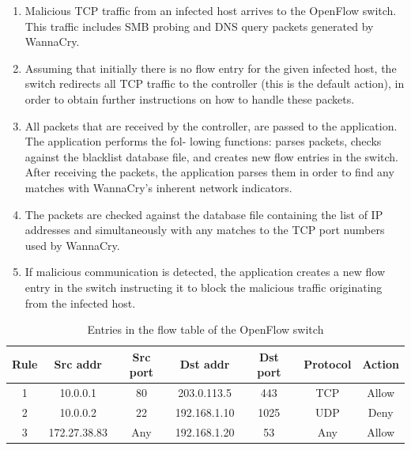 \documentclass[12pt,letterpaper]{article}
\begin{document}
            \begin{enumerate}
                \item Malicious \ac{TCP} traffic from an infected host arrives to the OpenFlow switch. This traffic includes \ac{SMB} probing and DNS query packets generated by WannaCry.

                \item Assuming that initially there is no flow entry for the given infected host, the switch redirects all TCP traffic to the controller (this is the default action), in order to obtain further instructions on how to handle these packets.

                \item All packets that are received by the controller, are passed to the application. The application performs the fol- lowing functions: parses packets, checks against the blacklist database file, and creates new flow entries in the switch. After receiving the packets, the application parses them in order to find any matches with WannaCry’s inherent network indicators.

                \item The packets are checked against the database file containing the list of IP addresses and simultaneously with any matches to the TCP port numbers used by WannaCry.

                \item If malicious communication is detected, the application creates a new flow entry in the switch instructing it to block the malicious traffic originating from the infected host.
               
            \end{enumerate}


            \begin{table}[h]
                \centering
                \caption{Entries in the flow table of the OpenFlow switch}
                \label{tab:firewall-rules}
                    \begin{tabular}{ccccccc}
                        \toprule
                \textbf{Rule} & \textbf{Src addr} & \textbf{Src port} & \textbf{Dst addr} & \textbf{Dst port} & \textbf{Protocol} & \textbf{Action} \\
                \midrule
        1 & 10.0.0.1 & 80 & 203.0.113.5 & 443 & TCP & Allow \\
        2 & 10.0.0.2 & 22 & 192.168.1.10 & 1025 & UDP & Deny \\
        3 & 172.27.38.83 & Any & 192.168.1.20 & 53 & Any & Allow \\
                \bottomrule
                \end{tabular}
            \end{table}
\end{document}
